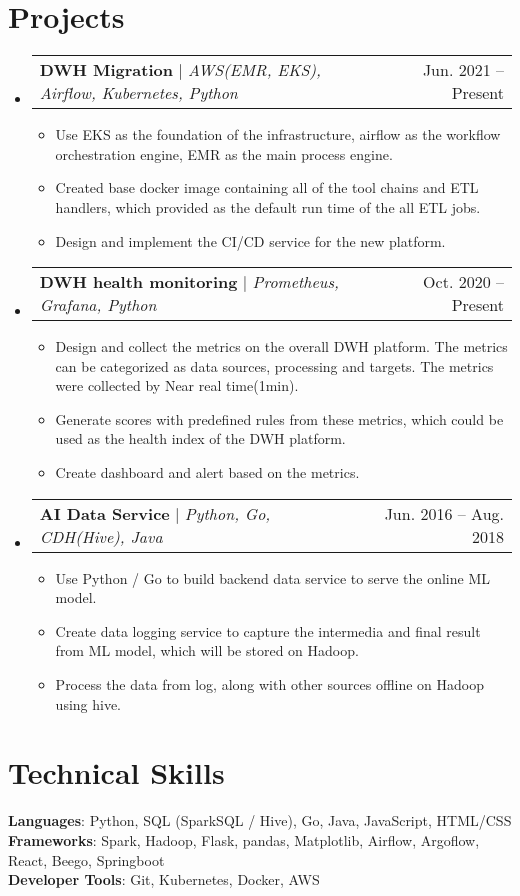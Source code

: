 \documentclass[a4paper,11pt]{article}
\makeatletter
\newcommand{\resumeItem}[1]{
  \item\small{
    {#1 \vspace{-2pt}}
  }
}
\newcommand{\resumeProjectHeading}[2]{
    \item
    \begin{tabular*}{0.97\textwidth}{l@{\extracolsep{\fill}}r}
      \small#1 & #2 \\
    \end{tabular*}\vspace{-7pt}
}
\newcommand{\resumeSubHeadingListStart}{\begin{itemize}[leftmargin=0.15in, label={}]}
\newcommand{\resumeSubHeadingListEnd}{\end{itemize}}
\newcommand{\resumeItemListStart}{\begin{itemize}}
\newcommand{\resumeItemListEnd}{\end{itemize}\vspace{-5pt}}
\makeatother
\begin{document}
\section{Projects}
    \resumeSubHeadingListStart
      \resumeProjectHeading
          {\textbf{DWH Migration} $|$ \emph{AWS(EMR, EKS), Airflow, Kubernetes, Python}}{Jun. 2021 -- Present}
          \resumeItemListStart
            \resumeItem{Use EKS as the foundation of the infrastructure, airflow as the workflow orchestration engine, EMR as the main process engine.}
            \resumeItem{Created base docker image containing all of the tool chains and ETL handlers, which provided as the default run time of the all ETL jobs.}
            \resumeItem{Design and implement the CI/CD service for the new platform.}
          \resumeItemListEnd
      \resumeProjectHeading
          {\textbf{DWH health monitoring} $|$ \emph{Prometheus, Grafana, Python}}{Oct. 2020 -- Present}
          \resumeItemListStart
            \resumeItem{Design and collect the metrics on the overall DWH platform. The metrics can be categorized as data sources, processing and targets. The metrics were collected by Near real time(1min).}
			\resumeItem{Generate scores with predefined rules from these metrics, which could be used as the health index of the DWH platform.}
			\resumeItem{Create dashboard and alert based on the metrics.}
          \resumeItemListEnd
	   \resumeProjectHeading
		   {\textbf{AI Data Service} $|$ \emph{Python, Go, CDH(Hive), Java}}{Jun. 2016 -- Aug. 2018}
          \resumeItemListStart
            \resumeItem{Use Python / Go to build backend data service to serve the online ML model.}
			\resumeItem{Create data logging service to capture the intermedia and final result from ML model, which will be stored on Hadoop.}
			\resumeItem{Process the data from log, along with other sources offline on Hadoop using hive.}
          \resumeItemListEnd
    \resumeSubHeadingListEnd


%
\section{Technical Skills}
 \begin{itemize}[leftmargin=0.15in, label={}]
    \small{\item{
     \textbf{Languages}{: Python, SQL (SparkSQL / Hive), Go, Java, JavaScript, HTML/CSS} \\
     \textbf{Frameworks}{: Spark, Hadoop, Flask, pandas, Matplotlib, Airflow, Argoflow, React, Beego, Springboot } \\
     \textbf{Developer Tools}{: Git, Kubernetes, Docker, AWS} \\
    }}
 \end{itemize}


\end{document}

